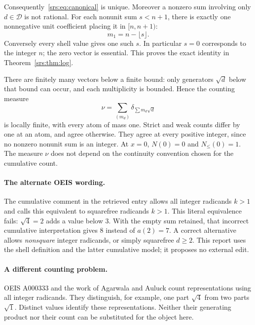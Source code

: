 \documentclass[11pt]{article}
\numberwithin{equation}{section}
\theoremstyle{remark}\newtheorem{remark}[theorem]{Remark}
\newcommand{\Sf}{\mathcal D}
\begin{document}
Consequently~\eqref{srs:eq:canonical} is unique. Moreover a nonzero sum involving only $d\in\Sf$ is not rational. For each nonunit sum $s<n+1$, there is exactly one nonnegative unit coefficient placing it in $[n,n+1)$:
\begin{equation}
 m_1=n-\lfloor s\rfloor.\label{srs:eq:unit}
\end{equation}
Conversely every shell value gives one such $s$. In particular $s=0$ corresponds to the integer $n$; the zero vector is essential. This proves the exact identity in Theorem~\ref{srs:thm:log}.

There are finitely many vectors below a finite bound: only generators $\sqrt d$ below that bound can occur, and each multiplicity is bounded. Hence the counting measure
\begin{equation}
 \nu=\sum_{(m_d)}\delta_{\sum m_d\sqrt d}\label{srs:eq:atomicmeasure}
\end{equation}
is locally finite, with every atom of mass one. Strict and weak counts differ by one at an atom, and agree otherwise. They agree at every positive integer, since no nonzero nonunit sum is an integer. At $x=0$, $N(0)=0$ and $N_{\le}(0)=1$. The measure $\nu$ does not depend on the continuity convention chosen for the cumulative count.

\paragraph{The alternate OEIS wording.}
The cumulative comment in the retrieved entry allows all integer radicands $k>1$ and calls this equivalent to squarefree radicands $k>1$. This literal equivalence fails: $\sqrt4=2$ adds a value below $3$. With the empty sum retained, that incorrect cumulative interpretation gives 8 instead of $a(2)=7$. A correct alternative allows \emph{nonsquare} integer radicands, or simply squarefree $d\ge2$. This report uses the shell definition and the latter cumulative model; it proposes no external edit.

\paragraph{A different counting problem.}
OEIS A000333 and the work of Agarwala and Auluck \cite{A000333,AA} count representations using all integer radicands. They distinguish, for example, one part $\sqrt4$ from two parts $\sqrt1$. Distinct values identify these representations. Neither their generating product nor their count can be substituted for the object here.
\end{document}
